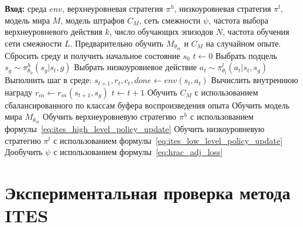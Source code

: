 \begin{algorithm}[tb]
\caption{ITES}
\label{algo:ites}
\begin{algorithmic}[1]
\State \textbf{Вход:} среда $env$, верхнеуровневая стратегия $\pi^h$, низкоуровневая стратегия $\pi^l$, модель мира $M$, модель штрафов $C_M$, сеть смежности $\psi$, частота выбора верхнеуровневого действия $k$, число обучающих эпизодов $N$, частота обучения сети смежности $L$.
\State Предварительно обучить $M_{\theta_m}$ и $C_M$ на случайном опыте.
    \State Сбросить среду и получить начальное состояние $s_0$
    \State $t \gets 0$
    \Repeat
            \State Выбрать подцель $s_{g} \sim \pi^h_{\theta_{h}}(s_g|s_t, g)$
        \EndIf
        \State Выбрать низкоуровневое действие $a_t \sim \pi^l_{\theta_l}(a_t|s_t,s_{g})$
        \State Выполнить шаг в среде: $s_{t+1}, r_t, c_t, done \gets env(s_t, a_t)$
        \State Вычислить внутреннюю награду $r_{in} \gets r_{in}(s_{t+1},s_{g})$
        \State $t \gets t+1$
    \State Обучить $C_M$ с использованием сбалансированного по классам буфера воспроизведения опыта
    \State Обучить модель мира $M_{\theta_m}$
    \State Обучить верхнеуровневую стратегию $\pi^h$ с использованием формулы~\eqref{eq:ites_high_level_policy_update}
    \State Обучить низкоуровневую стратегию $\pi^l$ с использованием формулы~\eqref{eq:ites_low_level_policy_update}
        \State Дообучить $\psi$ с использованием формулы~\eqref{eq:hrac_adj_loss}
    \EndIf
\EndFor
\end{algorithmic}
\end{algorithm}

\section{Экспериментальная проверка метода ITES}
\label{sec:ites_experiments}

